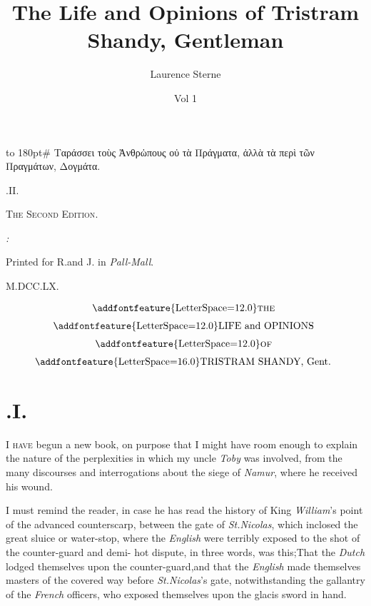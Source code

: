 \documentclass{article}
\title{The Life and Opinions of Tristram Shandy, Gentleman}
\author{Laurence Sterne}
\date{Vol 1}
\begin{document}
\pagestyle{empty}
\vbox{\openup 10pt}
\vfill
\vbox{\openup -2pt\halign to 180pt{\footnotesize #\cr
\quad Ταράσσει τοὺς Ἀνθρὠπους οὐ τὰ Πράγματα,\cr
ἀλλὰ τὰ περὶ τῶν Πραγμάτων, Δογμάτα.\hfill\cr}}
\vfill
\centerline{.\quad II.}
\smallskip
\centerline{\textsc{The Second Edition}.}
\vfill
\centerline{\itshape{}:}
\centerline{\smaller Printed for R.\@ and J.\@ {} in \textit{Pall-Mall}.}
\centerline{M.DCC.LX.}
\newpage
\null
\newpage
\pagestyle{fancy}
\thispagestyle{empty}
\setcounter{page}{1}
\[\vbox{\openup 6pt\halign{\hss # \hss\cr
\addfontfeature{LetterSpace=12.0}\textsc{the}\cr
\addfontfeature{LetterSpace=12.0}LIFE and OPINIONS\cr
\addfontfeature{LetterSpace=12.0}\textsc{of}\cr
{\addfontfeature{LetterSpace=16.0}TRISTRAM SHANDY}, Gent.\cr}}\]

\vskip 6pt
\setlength{\baselineskip}{14pt}  %

\section{.\enspace  I.}

\lettrine{I}{ have} begun a new book, on purpose that I might
have room enough to explain the nature of the perplexities in
which my uncle \textit{Toby} was involved, from the many
discourses and interrogations about the siege of \textit{Namur},
where he received his wound.

I must remind the reader, in case he has read the history of
King \textit{William}’s 
point of the advanced counterscarp,
be\-tween the gate of \textit{St.\@ Nicolas}, which inclo\-sed the
great sluice or water-stop, where the \textit{English} were
terribly exposed to the shot of the counter-guard and
demi-\break
{}
hot dispute, in three words, was this;\break That the \textit{Dutch}
lodged themselves upon the counter-guard,\tsk and that the
\textit{English} made themselves masters of the covered way
before \textit{St.\@ Nicolas}'s gate, notwithstanding the gallantry
of the \textit{French} offi\-cers, who exposed themselves upon the\break
glacis sword in hand.
\end{document}
